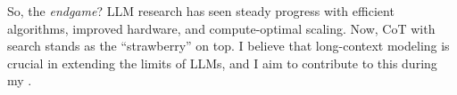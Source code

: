 So, the \textit{endgame}?
%
LLM research has seen steady progress with efficient algorithms, improved hardware, and compute-optimal scaling.
%
Now, CoT with search stands as the ``strawberry'' on top.
%
I believe that long-context modeling is crucial in extending the limits of LLMs, and I aim to contribute to this during my \thedegree.

